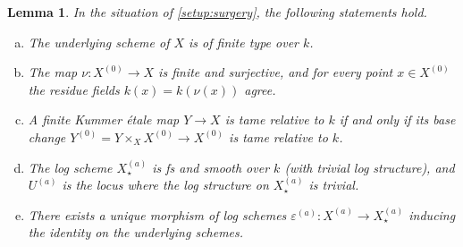 \documentclass[a4paper,twoside,11pt,reqno]{amsart}
\newtheorem{lem}[thm]{Lemma}
\theoremstyle{definition}
\numberwithin{equation}{subsection}
\begin{document}
\begin{lem} \label{lem:surgery-properties}
    In the situation of \cref{setup:surgery}, the following statements hold. 
    \begin{enumerate}[(a)]
        \item \label{lemitem:surgery-finite-type}
        The underlying scheme of $X$ is of finite type over $k$.
        
        \item \label{lemitem:surgery-finite-normalisation}
        The map $\nu\colon X^{(0)}\to X$ is finite and surjective, and for every point $x \in X^{(0)}$ the residue fields $k(x) = k(\nu(x))$ agree. 
        
        \item \label{lemitem:surgery-tameness}
        A finite Kummer \'etale map $Y\to X$ is tame relative to $k$ if and only if its base change $Y^{(0)} = Y\times_X X^{(0)}\to X^{(0)}$ is tame relative to $k$. 
                
        \item \label{lemitem:surgery-fs-and-smooth}
        The log scheme $X^{(a)}_\star$ is fs and smooth over $k$ (with trivial log structure), and $U^{(a)}$ is the locus where the log structure on $X^{(a)}_\star$ is trivial.

        \item \label{lemitem:surgery-relative-strip-off-log}
        There exists a unique morphism of log schemes $\varepsilon^{(a)}\colon X^{(a)} \to X^{(a)}_\star$ inducing the identity on the underlying schemes. 
    \end{enumerate}
\end{lem}
\end{document}

